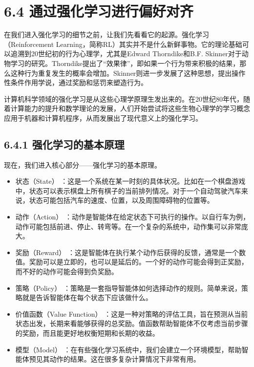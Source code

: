 \documentclass[
]{article}
\author{}
\date{}
\providecommand{\tightlist}{%
  \setlength{\itemsep}{0pt}\setlength{\parskip}{0pt}}
\begin{document}
{
\setcounter{tocdepth}{3}
\tableofcontents
}
\section{6.4
通过强化学习进行偏好对齐}\label{ux901aux8fc7ux5f3aux5316ux5b66ux4e60ux8fdbux884cux504fux597dux5bf9ux9f50}

在我们进入强化学习的细节之前，让我们先看看它的起源。强化学习（Reinforcement
Learning，简称RL）其实并不是什么新鲜事物。它的理论基础可以追溯到20世纪初的行为心理学，尤其是Edward
Thorndike和B.F.
Skinner对于动物学习的研究。Thorndike提出了``效果律''，即如果一个行为带来积极的结果，那么这种行为重复发生的概率会增加。Skinner则进一步发展了这种思想，提出操作性条件作用学说，通过奖励和惩罚来塑造行为。

计算机科学领域的强化学习是从这些心理学原理生发出来的。在20世纪80年代，随着计算能力的提升和数学理论的发展，人们开始尝试将这些生物心理学的学习概念应用于机器和计算机程序，从而发展出了现代意义上的强化学习。

\subsection{6.4.1
强化学习的基本原理}\label{ux5f3aux5316ux5b66ux4e60ux7684ux57faux672cux539fux7406}

现在，我们进入核心部分------强化学习的基本原理。

\begin{itemize}
\tightlist
\item
  状态（State）
  ：这是一个系统在某一时刻的具体状况。比如在一个棋盘游戏中，状态可以表示棋盘上所有棋子的当前排列情况。对于一个自动驾驶汽车来说，状态可能包括汽车的速度、位置，以及周围障碍物的位置等。
\item
  动作（Action）
  ：动作是智能体在给定状态下可执行的操作。以自行车为例，动作可能包括前进、停止、转弯等。在一个复杂的系统中，动作集可以非常庞大。
\item
  奖励（Reward）
  ：这是智能体在执行某个动作后获得的反馈，通常是一个数值。奖励可以是立即的，也可以是延后的。一个好的动作可能会得到正奖励，而不好的动作可能会得到负奖励。
\item
  策略（Policy）
  ：策略是一套指导智能体如何选择动作的规则。简单来说，策略就是告诉智能体在每个状态下应该做什么。
\item
  价值函数（Value Function）
  ：这是一种对策略的评估工具，旨在预测从当前状态出发，长期来看能够获得的总奖励。值函数帮助智能体不仅考虑当前步骤的奖励，而且能更好地权衡短期和长期的收益。
\item
  模型（Model）
  ：在有些强化学习系统中，我们会建立一个环境模型，帮助智能体预见其动作的结果。这在很多复杂计算情况下非常有用。
\end{itemize}
\end{document}
